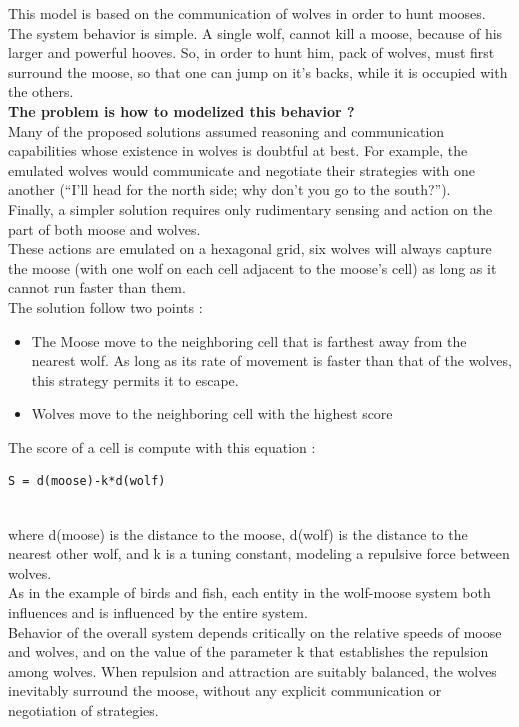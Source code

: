This model is based on the communication of wolves in order to hunt mooses.\\
The system behavior is simple. A single wolf, cannot kill a moose, because of his larger and powerful hooves. So, in order to hunt him, pack of wolves, must first surround the moose, so that one can jump on it's backs, while it is occupied with the others.\\
\textbf{The problem is how to modelized this behavior ?}\\
Many of the proposed solutions assumed reasoning and communication capabilities whose existence in wolves is doubtful at best. For example, the emulated wolves would communicate and negotiate their strategies with one another (“I’ll head for the north side; why don’t you go to the south?”).\\
Finally, a simpler solution requires only rudimentary sensing and action on the part of both moose and wolves.\\
These actions are emulated on a hexagonal grid, six wolves will always capture the moose (with one wolf on each cell adjacent to the moose’s cell) as long as it cannot run faster than them.\\

The solution follow two points :
\begin{itemize}
\item The Moose move to the neighboring cell that is farthest away from the nearest wolf. As long as its rate of movement is faster than that of the wolves, this strategy permits it to escape.
\item Wolves move to the neighboring cell with the highest score
\end{itemize}

The score of a cell is compute with this equation :
\begin{lstlisting}[frame=trBL, title=Score calculation]
			S = d(moose)-k*d(wolf)
\end{lstlisting}
~\\
where d(moose) is the distance to the moose, d(wolf) is the distance to the nearest other wolf, and k is a
tuning constant, modeling a repulsive force between wolves.\\

As in the example of birds and fish, each entity in the wolf-moose system both influences and is influenced by the entire system.\\
Behavior of the overall system depends critically on the relative speeds of moose and wolves, and on the value of the parameter k that establishes the repulsion among wolves. When repulsion and attraction are suitably balanced, the wolves inevitably surround the moose, without any explicit communication or negotiation of strategies.
